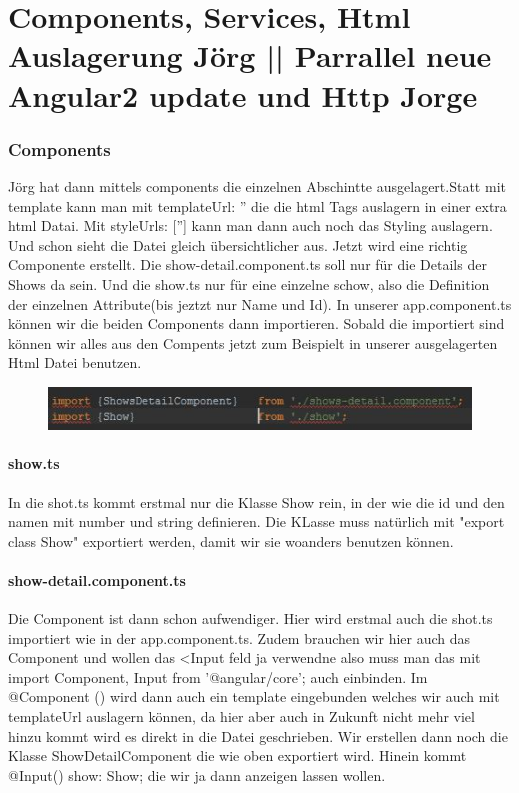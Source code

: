 \documentclass[12pt,titlepage]{article}
\begin{document}
\newpage
\part{Components, Services, Html Auslagerung Jörg || Parrallel neue Angular2 update und Http Jorge}
\section{Components}
Jörg hat dann mittels components die einzelnen Abschintte ausgelagert.Statt mit template kann man mit templateUrl: '' die die html Tags auslagern in einer extra html Datai.  Mit styleUrls: [''] kann man dann auch noch das Styling auslagern. Und schon sieht die Datei gleich übersichtlicher aus. Jetzt wird eine richtig Componente erstellt. Die show-detail.component.ts soll nur für die Details der Shows da sein. Und die show.ts nur für eine einzelne schow, also die Definition der einzelnen Attribute(bis jeztzt nur Name und Id). In unserer app.component.ts können wir die beiden Components dann importieren. Sobald die importiert sind können wir alles aus den Compents jetzt zum Beispielt in unserer ausgelagerten Html Datei benutzen.

\begin{figure}[h]
\begin{center}
\includegraphics[scale=1.2]{links/import_erste_components.jpg}
\label{scene_intro_scale}
\end{center}
\end{figure}

\subsection{show.ts}
In die shot.ts kommt erstmal nur die Klasse Show rein, in der wie die id und den namen mit number und string definieren. Die KLasse muss natürlich mit "export class Show" exportiert werden, damit wir sie woanders benutzen können. 

\subsection{show-detail.component.ts}
Die Component ist dann schon aufwendiger. Hier wird erstmal auch die shot.ts importiert wie in der app.component.ts. Zudem brauchen wir hier auch das Component und wollen das <Input feld ja verwendne also muss man das mit import { Component, Input } from '@angular/core'; auch einbinden. Im @Component ({}) wird dann auch ein template eingebunden welches wir auch mit templateUrl auslagern können, da hier aber auch in Zukunft nicht mehr viel hinzu kommt wird es direkt in die Datei geschrieben. Wir erstellen dann noch die Klasse ShowDetailComponent die wie oben exportiert wird. Hinein kommt @Input() show: Show; die wir ja dann anzeigen lassen wollen.
\end{document}
